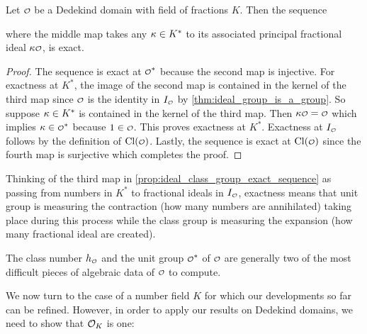     \begin{proposition}\label{prop:ideal_class_group_exact_sequence}
      Let $\smc{O}$ be a Dedekind domain with field of fractions $K$. Then the sequence

      \begin{center}
      \end{center}

      where the middle map takes any $\kappa \in K^{\ast}$ to its associated principal fractional ideal $\k\smc{O}$, is exact.
    \end{proposition}
    \begin{proof}
      The sequence is exact at $\smc{O}^{\ast}$ because the second map is injective. For exactness at $K^{\ast}$, the image of the second map is contained in the kernel of the third map since $\smc{O}$ is the identity in $I_{\smc{O}}$ by \cref{thm:ideal_group_is_a_group}. So suppose $\kappa \in K^{\ast}$ is contained in the kernel of the third map. Then $\k\smc{O} = \smc{O}$ which implies $\k \in \smc{O}^{\ast}$ because $1 \in \smc{O}$. This proves exactness at $K^{\ast}$. Exactness at $I_{\smc{O}}$ follows by the definition of $\Cl(\smc{O})$. Lastly, the sequence is exact at $\Cl(\smc{O})$ since the fourth map is surjective which completes the proof.
    \end{proof}

    Thinking of the third map in \cref{prop:ideal_class_group_exact_sequence} as passing from numbers in $K^{\ast}$ to fractional ideals in $I_{\smc{O}}$, exactness means that unit group is measuring the contraction (how many numbers are annihilated) taking place during this process while the class group is measuring the expansion (how many fractional ideal are created).
    
    \begin{remark}
      The class number $h_{\smc{O}}$ and the unit group $\smc{O}^{\ast}$ of $\smc{O}$ are generally two of the most difficult pieces of algebraic data of $\smc{O}$ to compute.
    \end{remark}
    
    We now turn to the case of a number field $K$ for which our developments so far can be refined. However, in order to apply our results on Dedekind domains, we need to show that $\mathcal{O}_{K}$ is one:

